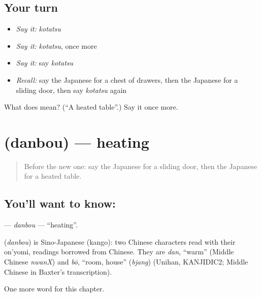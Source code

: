 \subsection*{Your turn}
\begin{itemize}
\raggedright
  \item \emph{Say it:} \emph{kotatsu}
  \item \emph{Say it:} \emph{kotatsu}, once more
  \item \emph{Say it:} say \emph{kotatsu}
  \item \emph{Recall:} say the Japanese for a chest of drawers, then the Japanese for a sliding door, then say \emph{kotatsu} again
\end{itemize}

\begin{tcolorbox}[breakable,colback=teal!4,colframe=teal!35!black,title={Before you move on}]
What does  mean? (\textquotedblleft{}A heated table\textquotedblright{}.) Say it once more.
\end{tcolorbox}
\section[\texorpdfstring{\ja{だんぼう} (danbou)}{だんぼう (danbou)}]{ (danbou) — heating}

\label{lesson:JA-C101-danbou}



\begin{quote}
Before the new one: say the Japanese for a sliding door, then the Japanese for a heated table.
\end{quote}

\subsection*{You'll want to know: }
\textbf{} — \emph{danbou} — \textquotedblleft{}heating\textquotedblright{}.

\begin{cousinweb}
\textbf{} (\emph{danbou}) is Sino-Japanese (kango): two Chinese characters read with their on'yomi, readings borrowed from Chinese. They are \emph{dan}, \textquotedblleft{}warm\textquotedblright{} (Middle Chinese \emph{nwanX}) and \emph{bō}, \textquotedblleft{}room, house\textquotedblright{} (\emph{bjang}) (Unihan, KANJIDIC2; Middle Chinese in Baxter's transcription).
\end{cousinweb}

\begin{grammarlens}[title={What you've built}]
One more word for this chapter.
\end{grammarlens}


